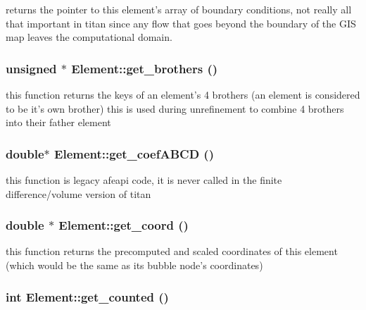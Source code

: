 returns the pointer to this element's array of boundary conditions, not really all that important in titan since any flow that goes beyond the boundary of the GIS map leaves the computational domain. 

\hypertarget{classElement_a16}{
\subsubsection[get\_\-brothers]{\setlength{\rightskip}{0pt plus 5cm}unsigned $\ast$ Element::get\_\-brothers ()}}
\label{classElement_a16}


this function returns the keys of an element's 4 brothers (an element is considered to be it's own brother) this is used during unrefinement to combine 4 brothers into their father element 

\hypertarget{classElement_a85}{
\subsubsection[get\_\-coefABCD]{\setlength{\rightskip}{0pt plus 5cm}double$\ast$ Element::get\_\-coef\-ABCD ()}}
\label{classElement_a85}


this function is legacy afeapi code, it is never called in the finite difference/volume version of titan 

\hypertarget{classElement_a103}{
\subsubsection[get\_\-coord]{\setlength{\rightskip}{0pt plus 5cm}double $\ast$ Element::get\_\-coord ()}}
\label{classElement_a103}


this function returns the precomputed and scaled coordinates of this element (which would be the same as its bubble node's coordinates) 

\hypertarget{classElement_a115}{
\subsubsection[get\_\-counted]{\setlength{\rightskip}{0pt plus 5cm}int Element::get\_\-counted ()}}
\label{classElement_a115}


